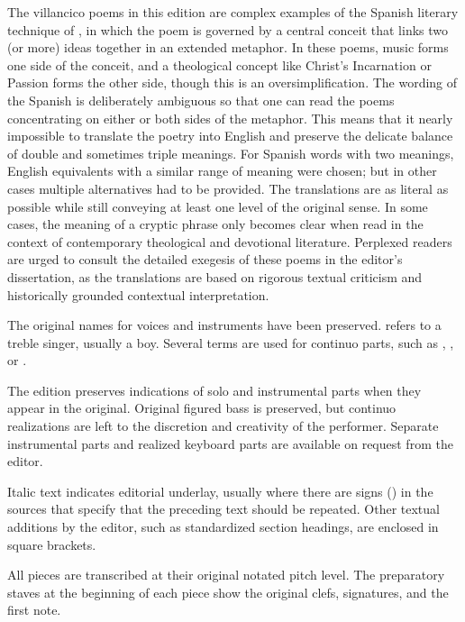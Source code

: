 The villancico poems in this edition are complex examples of the Spanish
literary technique of , in which the poem is governed by a
central conceit that links two (or more) ideas together in an extended
metaphor.%
    \Autocite{Gaylord:Poetry}
In these poems, music forms one side of the conceit, and a theological concept
like Christ's Incarnation or Passion forms the other side, though this is an
oversimplification.
The wording of the Spanish is deliberately ambiguous so that one can read the
poems concentrating on either or both sides of the metaphor.
This means that it nearly impossible to translate the poetry into English and
preserve the delicate balance of double and sometimes triple meanings.
For Spanish words with two meanings, English equivalents with a similar range of
meaning were chosen; but in other cases multiple alternatives had to be
provided.
The translations are as literal as possible while still conveying at least one
level of the original sense.
In some cases, the meaning of a cryptic phrase only becomes clear when read in
the context of contemporary theological and devotional literature.
Perplexed readers are urged to consult the detailed exegesis of these poems in
the editor's dissertation, as the translations are based on rigorous textual
criticism and historically grounded contextual interpretation.

The original names for voices and instruments have been preserved. 
 refers to a treble singer, usually a boy.
Several terms are used for continuo parts, such as ,
, or .

The edition preserves indications of solo and instrumental parts when they
appear in the original.
Original figured bass is preserved, but continuo realizations are left to the
discretion and creativity of the performer.
Separate instrumental parts and realized keyboard parts are available on request
from the editor.

Italic text indicates editorial underlay, usually where there are signs
(\MSrepeat{}) in the sources that specify that the preceding text should
be repeated.
Other textual additions by the editor, such as standardized section headings, 
are enclosed in square brackets.

All pieces are transcribed at their original notated pitch level.
The preparatory staves at the beginning of each piece show the original clefs, 
signatures, and the first note.

